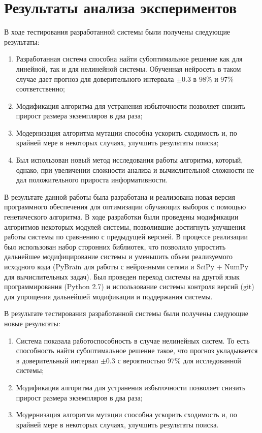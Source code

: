 \documentclass[utf8,usehyperref,14pt]{G7-32}
\begin{document}
\section{Результаты анализа экспериментов}
В ходе тестирования разработанной системы были получены следующие результаты:
\begin{enumerate}
\item Разработанная система способна найти субоптимальное решение как для линейной, так и для нелинейной системы. Обученная нейросеть в таком случае дает прогноз для доверительного интервала $ \pm 0.3 $ в 98\% и 97\% соответственно;
\item Модификация алгоритма для устранения избыточности позволяет снизить прирост размера экземпляров в два раза;
\item Модернизация алгоритма мутации способна ускорить сходимость и, по крайней мере в некоторых случаях, улучшить результаты поиска;
\item Был использован новый метод исследования работы алгоритма, который, однако, при увеличении сложности анализа и вычислительной сложности не дал положительного прироста информативности.
\end{enumerate}


\backmatter %

\Conclusion %

В результате данной работы была разработана и реализована новая версия программного обеспечения для оптимизации обучающих выборок с помощью генетического алгоритма. В ходе разработки были проведены модификации алгоритмов некоторых модулей системы, позволившие достигнуть улучшения работы системы по сравнению с предыдущей версией. В процессе реализации был использован набор сторонних библиотек, что позволило упростить дальнейшее модифицирование системы и уменьшить объем реализуемого исходного кода (PyBrain для работы с нейронными сетями и SciPy + NumPy для вычислительных задач). Был проведен переход системы на другой язык программирования (Python 2.7) и использование системы контроля версий (git) для упрощения дальнейшей модификации и поддержания системы.

В результате тестирования разработанной системы были получены следующие новые результаты:
\begin{enumerate}
\item Система показала работоспособность в случае нелинейных систем. То есть способность найти субоптимальное решение такое, что прогноз укладывается в доверительный интервал $ \pm 0.3 $ с вероятностью 97\% для исследованной системы;
\item Модификация алгоритма для устранения избыточности позволяет снизить прирост размера экземпляров в два раза;
\item Модернизация алгоритма мутации способна ускорить сходимость и, по крайней мере в некоторых случаях, улучшить результаты поиска.
\end{enumerate}
\end{document}
